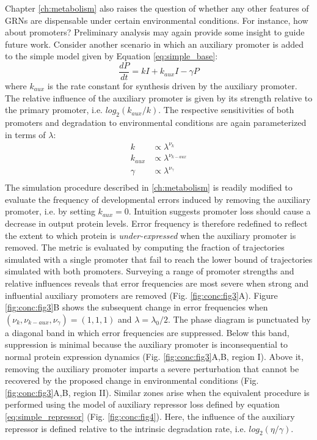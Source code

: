 Chapter \ref{ch:metabolism} also raises the question of whether any other features of GRNs are dispensable under certain environmental conditions. For instance, how about promoters? Preliminary analysis may again provide some insight to guide future work. Consider another scenario in which an auxiliary promoter is added to the simple model given by Equation \ref{eq:simple_base}:
\begin{equation}
\label{eq:simple_promoter}
\frac{dP}{dt} = kI + k_{aux}I - \gamma P
\end{equation}
where $k_{aux}$ is the rate constant for synthesis driven by the auxiliary promoter. The relative influence of the auxiliary promoter is given by its strength relative to the primary promoter, i.e. $log_2 ( k_{aux} / k )$. The respective sensitivities of both promoters and degradation to environmental conditions are again parameterized in terms of $\lambda$:
\begin{equation}
\begin{aligned}
k &\propto \lambda^{\nu_k} \\
k_{aux} &\propto \lambda^{\nu_{k-aux}} \\
\gamma &\propto \lambda^{\nu_{\gamma}} \\
\end{aligned}
\end{equation}
The simulation procedure described in \ref{ch:metabolism} is readily modified to evaluate the frequency of developmental errors induced by removing the auxiliary promoter, i.e. by setting $k_{aux}=0$. Intuition suggests promoter loss should cause a decrease in output protein levels. Error frequency is therefore redefined to reflect the extent to which protein is \emph{under-expressed} when the auxiliary promoter is removed. The metric is evaluated by computing the fraction of trajectories simulated with a single promoter that fail to reach the lower bound of trajectories simulated with both promoters. Surveying a range of promoter strengths and relative influences reveals that error frequencies are most severe when strong and influential auxiliary promoters are removed (Fig. \ref{fig:conc:fig3}A). Figure \ref{fig:conc:fig3}B shows the subsequent change in error frequencies when $(\nu_k, \nu_{k-aux},\nu_{\gamma}) = (1,1,1)$ and $\lambda = \lambda_0 / 2$. The phase diagram is punctuated by a diagonal band in which error frequencies are suppressed. Below this band, suppression is minimal because the auxiliary promoter is inconsequential to normal protein expression dynamics (Fig. \ref{fig:conc:fig3}A,B, region I). Above it, removing the auxiliary promoter imparts a severe perturbation that cannot be recovered by the proposed change in environmental conditions (Fig. \ref{fig:conc:fig3}A,B, region II). Similar zones arise when the equivalent procedure is performed using the model of auxiliary repressor loss defined by equation \ref{eq:simple_repressor} (Fig. \ref{fig:conc:fig4}). Here, the influence of the auxiliary repressor is defined relative to the intrinsic degradation rate, i.e. $log_2 ( \eta / \gamma )$. 

